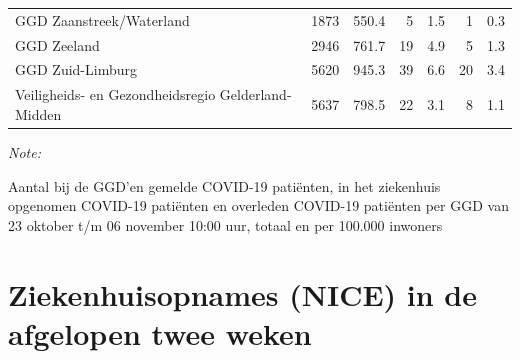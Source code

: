 \documentclass[
  english,
  man,floatsintext]{apa6}
\begin{document}
\begin{table}
\begin{threeparttable}
\begin{tabular}{lrrrrrr}
GGD Zaanstreek/Waterland & 1873 & 550.4 & 5 & 1.5 & 1 & 0.3\\
GGD Zeeland & 2946 & 761.7 & 19 & 4.9 & 5 & 1.3\\
GGD Zuid-Limburg & 5620 & 945.3 & 39 & 6.6 & 20 & 3.4\\
Veiligheids- en Gezondheidsregio Gelderland-Midden & 5637 & 798.5 & 22 & 3.1 & 8 & 1.1\\
\bottomrule
\end{tabular}
\begin{tablenotes}
\item \textit{Note: } 
\item Aantal bij de GGD’en gemelde COVID-19 patiënten, in het ziekenhuis opgenomen COVID-19 patiënten en overleden COVID-19 patiënten per GGD van 23 oktober t/m 06 november 10:00 uur, totaal en per 100.000 inwoners
\end{tablenotes}
\end{threeparttable}
\endgroup{}
\end{table}

\newpage

\hypertarget{ziekenhuisopnames-nice-in-de-afgelopen-twee-weken}{%
\section{Ziekenhuisopnames (NICE) in de afgelopen twee weken}\label{ziekenhuisopnames-nice-in-de-afgelopen-twee-weken}}
\end{document}
